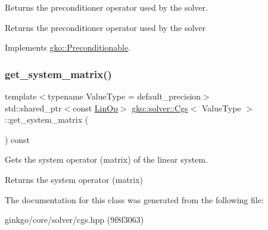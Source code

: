 Returns the preconditioner operator used by the solver. 

\begin{DoxyReturn}{Returns}
the preconditioner operator used by the solver 
\end{DoxyReturn}


Implements \hyperlink{classgko_1_1Preconditionable_ad9545089aef0dfc83bc7a74e5bf1d748}{gko\+::\+Preconditionable}.

\mbox{\label{classgko_1_1solver_1_1Cgs_aa537b2e6b7ccf95e96b4100866da1770}} 
\subsubsection{\texorpdfstring{get\+\_\+system\+\_\+matrix()}{get\_system\_matrix()}}
{\footnotesize\ttfamily template$<$typename Value\+Type  = default\+\_\+precision$>$ \\
std\+::shared\+\_\+ptr$<$const \hyperlink{classgko_1_1LinOp}{Lin\+Op}$>$ \hyperlink{classgko_1_1solver_1_1Cgs}{gko\+::solver\+::\+Cgs}$<$ Value\+Type $>$\+::get\+\_\+system\+\_\+matrix (\begin{DoxyParamCaption}{ }\end{DoxyParamCaption}) const}



Gets the system operator (matrix) of the linear system. 

\begin{DoxyReturn}{Returns}
the system operator (matrix) 
\end{DoxyReturn}


The documentation for this class was generated from the following file\+:\begin{DoxyCompactItemize}
\item 
ginkgo/core/solver/cgs.\+hpp (9f8f3063)\end{DoxyCompactItemize}
